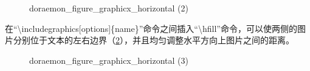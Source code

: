 \documentclass{article}
\begin{document}
    \begin{figure}[htbp]
        \centering
        \caption{doraemon\_figure\_graphicx\_horizontal (2)}
        \label{2}
    \end{figure}

    在``\textbackslash includegraphics[options]\{name\}''命令之间插入``\textbackslash hfill''命令，可以使两侧的图片分别位于文本的左右边界（\ref{3}），并且均匀调整水平方向上图片之间的距离。

    \begin{figure}[htbp]
        \centering
        \hfill
        \hfill
        \caption{doraemon\_figure\_graphicx\_horizontal (3)}
        \label{3}
    \end{figure}
\end{document}

